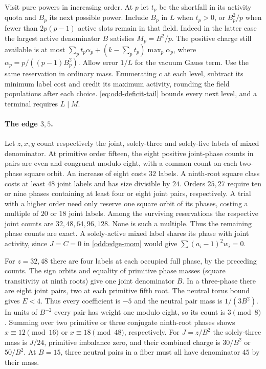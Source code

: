 \documentclass[11pt]{amsart}
\numberwithin{equation}{section}
\theoremstyle{definition}
\theoremstyle{plain}
\begin{document}
Visit pure powers in increasing order. At $p$ let $t_p$ be the shortfall
in its activity quota and $B_p$ its next possible power. Include $B_p$
in $L$ when $t_p>0$, or $B_p^2/p$ when fewer than $2p(p-1)$ active
slots remain in that field. Indeed in the latter case the largest
active denominator $B$ satisfies $M_p=B^2/p$. The positive charge
still available is at most
$\sum_p t_p\alpha_p+(k-\sum_p t_p)\max_p\alpha_p$, where
$\alpha_p=p/((p-1)B_p^2)$. Allow error $1/L$ for the vacuum Gauss term.
Use the same reservation in ordinary mass. Enumerating $c$ at each
level, subtract its minimum label cost and credit its maximum activity,
rounding the field populations after each choice. \eqref{eq:odd-deficit-tail}
bounds every next level, and a terminal requires $L\mid M$.

\paragraph{The edge $3,5$.}
Let $z,x,y$ count respectively the joint, solely-three and solely-five
labels of mixed denominator. At primitive order fifteen, the eight
positive joint-phase counts in pairs are even and congruent modulo
eight, with a common count on each two-phase square orbit. An increase
of eight costs $32$ labels. A ninth-root square class costs at least
$48$ joint labels and has size divisible by $24$. Orders $25,27$ require
ten or nine phases containing at least four or eight joint pairs,
respectively. A trial with a higher order need only reserve one square orbit of
its phases, costing a multiple of $20$ or $18$ joint labels. Among the
surviving reservations the respective joint counts are $32,48,64,96,128$.
None is such a multiple. Thus the remaining phase counts are exact. A solely-active mixed label shares its phase with
joint activity, since $J=C=0$ in \eqref{odd:edge-mom} would give
$\sum(a_i-1)^2w_i=0$.

For $z=32,48$ there are four labels at each occupied full phase, by
the preceding counts. The sign orbits and equality of primitive
phase masses (square transitivity at ninth roots) give one joint
denominator $B$. In a three-phase there are eight joint pairs, two
at each primitive fifth root. The neutral torus bound gives $E<4$.
Thus every coefficient is $-5$ and the neutral pair mass is
$1/(3B^2)$. In units of $B^{-2}$ every pair has weight one modulo
eight, so its count is $3\pmod8$. Summing over two primitive or
three conjugate ninth-root phases shows $x\equiv12\pmod{16}$ or
$x\equiv18\pmod{48}$, respectively. For $J=z/B^2$ the solely-three
mass is $J/24$, primitive imbalance zero, and their combined charge
is $30/B^2$ or $50/B^2$. At $B=15$, three neutral pairs in a fiber
must all have denominator $45$ by their mass.
\end{document}
